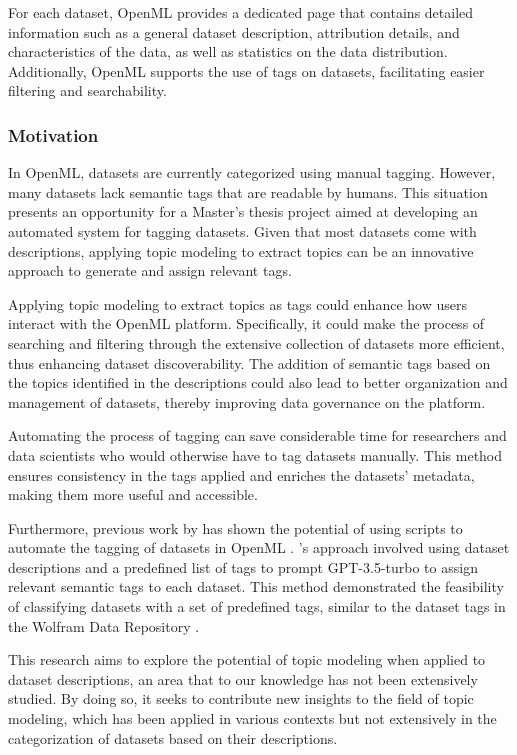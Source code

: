 \documentclass{article}
\begin{document}
For each dataset, OpenML provides a dedicated page that contains detailed information such as a general dataset description, attribution details, and characteristics of the data, as well as statistics on the data distribution. Additionally, OpenML supports the use of tags on datasets, facilitating easier filtering and searchability.

\subsubsection{Motivation}
In OpenML, datasets are currently categorized using manual tagging. However, many datasets lack semantic tags that are readable by humans. This situation presents an opportunity for a Master's thesis project aimed at developing an automated system for tagging datasets. Given that most datasets come with descriptions, applying topic modeling to extract topics can be an innovative approach to generate and assign relevant tags.

Applying topic modeling to extract topics as tags could enhance how users interact with the OpenML platform. Specifically, it could make the process of searching and filtering through the extensive collection of datasets more efficient, thus enhancing dataset discoverability. The addition of semantic tags based on the topics identified in the descriptions could also lead to better organization and management of datasets, thereby improving data governance on the platform.

Automating the process of tagging can save considerable time for researchers and data scientists who would otherwise have to tag datasets manually. This method ensures consistency in the tags applied and enriches the datasets' metadata, making them more useful and accessible.

Furthermore, previous work by \citeauthor{das_openmlscripts_nodate} has shown the potential of using scripts to automate the tagging of datasets in OpenML \cite{das_openmlscripts_nodate}. \citeauthor{das_openmlscripts_nodate}'s approach involved using dataset descriptions and a predefined list of tags to prompt GPT-3.5-turbo to assign relevant semantic tags to each dataset. This method demonstrated the feasibility of classifying datasets with a set of predefined tags, similar to the dataset tags in the Wolfram Data Repository \cite{noauthor_wolfram_nodate}.

This research aims to explore the potential of topic modeling when applied to dataset descriptions, an area that to our knowledge has not been extensively studied. By doing so, it seeks to contribute new insights to the field of topic modeling, which has been applied in various contexts but not extensively in the categorization of datasets based on their descriptions.
\end{document}
